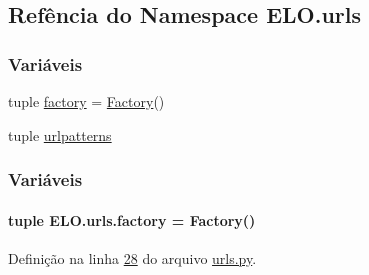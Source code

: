 \hypertarget{namespaceELO_1_1urls}{\subsection{Refência do Namespace E\-L\-O.\-urls}
\label{namespaceELO_1_1urls}
}
\subsubsection*{Variáveis}
\begin{DoxyCompactItemize}
\item 
tuple \hyperlink{namespaceELO_1_1urls_a85325dfebd736ced5558533f2c4bc29a}{factory} = \hyperlink{classELO_1_1MainUnit_1_1Factory}{Factory}()
\item 
tuple \hyperlink{namespaceELO_1_1urls_a3451f093ed6ab05c006fd0d1cdba836d}{urlpatterns}
\end{DoxyCompactItemize}


\subsubsection{Variáveis}
\hypertarget{namespaceELO_1_1urls_a85325dfebd736ced5558533f2c4bc29a}{
\paragraph[{factory}]{\setlength{\rightskip}{0pt plus 5cm}tuple E\-L\-O.\-urls.\-factory = {\bf Factory}()}}\label{namespaceELO_1_1urls_a85325dfebd736ced5558533f2c4bc29a}


Definição na linha \hyperlink{urls_8py_source_l00028}{28} do arquivo \hyperlink{urls_8py_source}{urls.\-py}.

